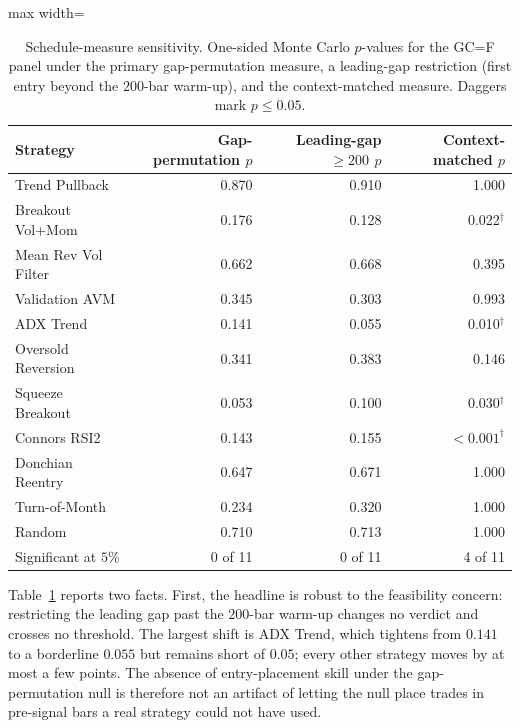 \documentclass[preprint,12pt]{elsarticle}
\theoremstyle{definition}
\begin{document}
\begin{table}[H]
\centering
\caption{Schedule-measure sensitivity. One-sided Monte Carlo $p$-values for the GC=F panel under the primary gap-permutation measure, a leading-gap restriction (first entry beyond the $200$-bar warm-up), and the context-matched measure. Daggers mark $p\le 0.05$.}
\label{tab:schedule_sensitivity}
{\small
\renewcommand{\arraystretch}{1.12}
\setlength{\tabcolsep}{7pt}
\begin{adjustbox}{max width=\textwidth}
\begin{tabular}{@{}lrrr@{}}
\toprule
Strategy & Gap-permutation $p$ & Leading-gap $\ge 200$ $p$ & Context-matched $p$ \\
\midrule
Trend Pullback      & 0.870 & 0.910 & 1.000 \\
Breakout Vol+Mom    & 0.176 & 0.128 & 0.022$^\dagger$ \\
Mean Rev Vol Filter & 0.662 & 0.668 & 0.395 \\
Validation AVM      & 0.345 & 0.303 & 0.993 \\
ADX Trend           & 0.141 & 0.055 & 0.010$^\dagger$ \\
Oversold Reversion  & 0.341 & 0.383 & 0.146 \\
Squeeze Breakout    & 0.053 & 0.100 & 0.030$^\dagger$ \\
Connors RSI2        & 0.143 & 0.155 & ${<}0.001^\dagger$ \\
Donchian Reentry    & 0.647 & 0.671 & 1.000 \\
Turn-of-Month       & 0.234 & 0.320 & 1.000 \\
Random              & 0.710 & 0.713 & 1.000 \\
\midrule
Significant at $5\%$ & 0 of 11 & 0 of 11 & 4 of 11 \\
\bottomrule
\end{tabular}
\end{adjustbox}
}
\end{table}

Table~\ref{tab:schedule_sensitivity} reports two facts. First, the headline is robust to the feasibility concern: restricting the leading gap past the $200$-bar warm-up changes no verdict and crosses no threshold. The largest shift is ADX Trend, which tightens from $0.141$ to a borderline $0.055$ but remains short of $0.05$; every other strategy moves by at most a few points. The absence of entry-placement skill under the gap-permutation null is therefore not an artifact of letting the null place trades in pre-signal bars a real strategy could not have used.
\end{document}
